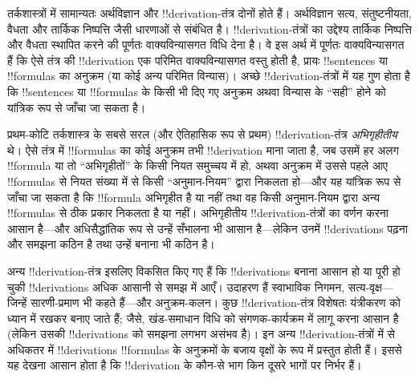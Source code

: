 \documentclass[../../../include/open-logic-section]{subfiles}
\begin{document}
      {}
      {}


तर्कशास्त्रों में सामान्यतः अर्थविज्ञान और !!{derivation}-तंत्र दोनों होते
हैं। अर्थविज्ञान सत्य, संतुष्टनीयता, वैधता और तार्किक निष्पत्ति जैसी धारणाओं
से संबंधित है। !!{derivation}-तंत्रों का उद्देश्य तार्किक निष्पत्ति और वैधता
स्थापित करने की पूर्णतः वाक्यविन्यासगत विधि देना है। वे इस अर्थ में पूर्णतः
वाक्यविन्यासगत हैं कि ऐसे तंत्र की !!{derivation} एक परिमित वाक्यविन्यासगत
वस्तु होती है, प्रायः !!{sentence}s या !!{formula}s का अनुक्रम (या कोई अन्य
परिमित विन्यास)। अच्छे !!{derivation}-तंत्रों में यह गुण होता है कि
!!{sentence}s या !!{formula}s के किसी भी दिए गए अनुक्रम अथवा विन्यास के ``सही''
होने को यांत्रिक रूप से जाँचा जा सकता है।

प्रथम-कोटि तर्कशास्त्र के सबसे सरल (और ऐतिहासिक रूप से प्रथम)
!!{derivation}-तंत्र \emph{अभिगृहीतीय} थे। ऐसे तंत्र में !!{formula}s का कोई
अनुक्रम तभी !!{derivation} माना जाता है, जब उसमें हर अलग !!{formula} या तो
``अभिगृहीतों'' के किसी नियत समुच्चय में हो, अथवा अनुक्रम में उससे पहले आए
!!{formula}s से नियत संख्या में से किसी ``अनुमान-नियम'' द्वारा निकलता हो—और
यह यांत्रिक रूप से जाँचा जा सकता है कि !!{formula} अभिगृहीत है या नहीं तथा
वह किसी अनुमान-नियम द्वारा अन्य !!{formula}s से ठीक प्रकार निकलता है या नहीं।
अभिगृहीतीय !!{derivation}-तंत्रों का वर्णन करना आसान है—और अधिसैद्धांतिक रूप
से उन्हें सँभालना भी आसान है—लेकिन उनमें !!{derivation}s पढ़ना और समझना कठिन
है तथा उन्हें बनाना भी कठिन है।

अन्य !!{derivation}-तंत्र इसलिए विकसित किए गए हैं कि !!{derivation}s बनाना
आसान हो या पूरी हो चुकी !!{derivation}s अधिक आसानी से समझ में आएँ। उदाहरण हैं
स्वाभाविक निगमन, सत्य-वृक्ष—जिन्हें सारणी-प्रमाण भी कहते हैं—और अनुक्रम-कलन।
कुछ !!{derivation}-तंत्र विशेषतः यंत्रीकरण को ध्यान में रखकर बनाए जाते हैं;
जैसे, खंड-समाधान विधि को संगणक-कार्यक्रम में लागू करना आसान है (लेकिन उसकी
!!{derivation}s को समझना लगभग असंभव है)। इन अन्य !!{derivation}-तंत्रों में से
अधिकतर में !!{derivation}s !!{formula}s के अनुक्रमों के बजाय वृक्षों के रूप
में प्रस्तुत होती हैं। इससे यह देखना आसान होता है कि !!{derivation} के
कौन-से भाग किन दूसरे भागों पर निर्भर हैं।
\end{document}
